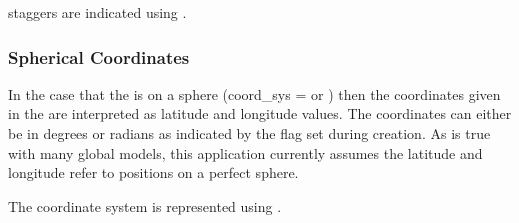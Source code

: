 \documentclass[letterpaper,10pt,english]{sphinxmanual}
\begin{document}
{\hyperref[\detokenize{grid:ESMF.api.grid.Grid}]{}} staggers are indicated using
{\hyperref[\detokenize{StaggerLoc:ESMF.api.constants.StaggerLoc}]{}}.

\begin{sphinxVerbatim}[commandchars=\\\{\}]
  \PYG{p}{[}\PYG{p}{]} 
\end{sphinxVerbatim}


\subsubsection{Spherical Coordinates}
\label{\detokenize{api:spherical-coordinates}}
In the case that the {\hyperref[\detokenize{grid:ESMF.api.grid.Grid}]{}} is on a sphere (coord\_sys = {\hyperref[\detokenize{CoordSys:ESMF.api.constants.CoordSys.SPH_DEG}]{}} or
{\hyperref[\detokenize{CoordSys:ESMF.api.constants.CoordSys.SPH_RAD}]{}}) then the coordinates given in the {\hyperref[\detokenize{grid:ESMF.api.grid.Grid}]{}} are interpreted
as latitude and longitude values. The coordinates can either be in degrees or
radians as indicated by the  flag set during {\hyperref[\detokenize{grid:ESMF.api.grid.Grid}]{}} creation. As is
true with many global models, this application currently assumes the latitude
and longitude refer to positions on a perfect sphere.

The {\hyperref[\detokenize{grid:ESMF.api.grid.Grid}]{}} coordinate system is represented using
{\hyperref[\detokenize{CoordSys:ESMF.api.constants.CoordSys}]{}}.

\begin{sphinxVerbatim}[commandchars=\\\{\}]
  \PYG{p}{[}\PYG{p}{]} 
\end{sphinxVerbatim}
\end{document}
